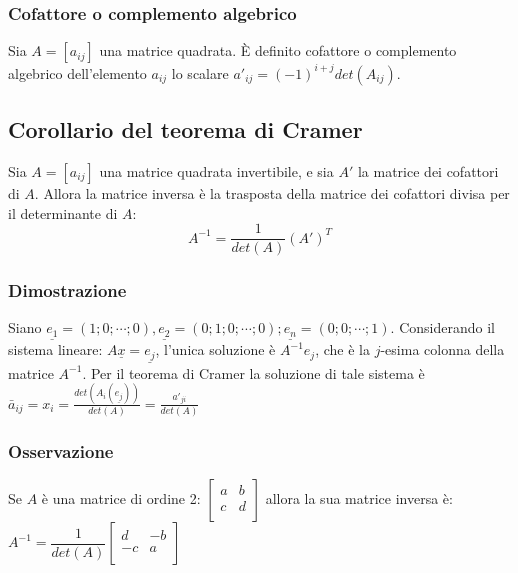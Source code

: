 \subsubsection{Cofattore o complemento algebrico}
Sia $A=[a_{ij}]$ una matrice quadrata. \`E definito cofattore o complemento algebrico dell'elemento $a_{ij}$ lo scalare $a'_{ij}=(-1)^{i+j}det(A_{ij})$.
\subsection{Corollario del teorema di Cramer}
Sia $A=[a_{ij}]$ una matrice quadrata invertibile, e sia $A'$ la matrice dei cofattori di $A$. Allora la matrice inversa \`e la trasposta della matrice dei cofattori divisa per
il determinante di $A$:
\begin{equation}
A^{-1}=\dfrac{1}{det(A)}(A')^T
\end{equation}
\subsubsection{Dimostrazione} Siano $\underline{e_1}=(1;0;\cdots;0),\underline{e_2}=(0;1;0;\cdots;0);\underline{e_n}=(0;0;\cdots;1)$. Considerando il sistema lineare: $A 
\underline{x}=\underline{e_j}$, l'unica soluzione \`e $A^{-1}e_j$, che \`e la $j$-esima colonna della matrice $A^{-1}$. Per il teorema di Cramer la soluzione di tale sistema \`e $\bar{a}_{ij}=x_i=\frac{det(A_i(\underline{e_j}))}{det(A)}=\frac{a'_{ji}}{det(A)}$ 
\subsubsection{Osservazione}
Se $A$ \`e una matrice di ordine 2:
$\left[\begin{matrix}
a & b \\
c & d\\
\end{matrix}\right]$
allora la sua matrice inversa \`e:$A^{-1}=\dfrac{1}{det(A)}
\left[\begin{matrix}
d & -b \\
-c & a\\
\end{matrix}\right]$